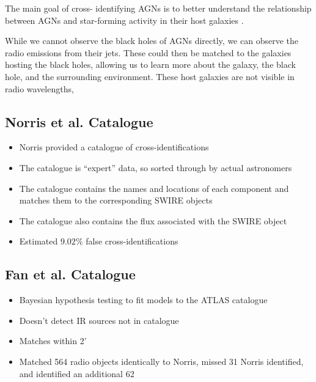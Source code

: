         The main goal of cross-
        identifying AGNs is to better understand the relationship between AGNs
        and star-forming activity in their host galaxies \citep{norris06}.

        While we cannot observe the black holes of AGNs directly, we can observe
        the radio emissions from their jets. These could then be matched to the
        galaxies hosting the black holes, allowing us to learn more about the
        galaxy, the black hole, and the surrounding environment. These host
        galaxies are not visible in radio wavelengths,

        \subsection{Norris et al. Catalogue}
        \label{sec:norris}

            \begin{itemize}
                \item Norris provided a catalogue of cross-identifications
                \item The catalogue is ``expert'' data, so sorted through by actual astronomers
                \item The catalogue contains the names and locations of each component and matches them to the corresponding SWIRE objects
                \item The catalogue also contains the flux associated with the SWIRE object
                \item Estimated $9.02\%$ false cross-identifications
            \end{itemize}

        \subsection{Fan et al. Catalogue}
        \label{sec:fan}

            \begin{itemize}
                \item Bayesian hypothesis testing to fit models to the ATLAS catalogue
                \item Doesn't detect IR sources not in catalogue
                \item Matches within 2'
                \item Matched 564 radio objects identically to Norris, missed 31 Norris identified, and identified an additional 62
            \end{itemize}

